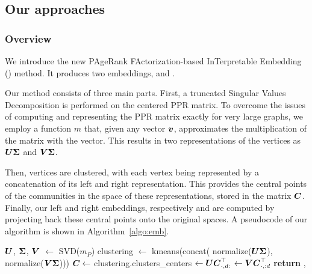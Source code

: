 
\subsection{Our approaches}\label{sec:approach}
\subsubsection{Overview} \label{subsec:overview}
We introduce the new PAgeRank FActorization-based InTerpretable Embedding (\parfaite) method. It produces two embeddings, \newembLeft and \newembRight.

Our method consists of three main parts. First, a truncated Singular Values Decomposition is performed on the centered PPR matrix. To overcome the issues of computing and representing the PPR matrix exactly for very large graphs, we employ a function $m$ that, given any vector $\boldsymbol{v}$, approximates the multiplication of the matrix with the vector. This results in two representations of the vertices as $\boldsymbol{U}\boldsymbol{\Sigma}$ and $\boldsymbol{V}\boldsymbol{\Sigma}$.

Then, vertices are clustered, with each vertex being represented by a concatenation of its left and right representation. This provides the central points of the communities in the space of these representations, stored in the matrix $\boldsymbol{C}$. Finally, our left and right embeddings, respectively \newembLeft and \newembRight are computed by projecting back these central points onto the original spaces. A pseudocode of our algorithm is shown in Algorithm~\ref{algo:emb}. 

\begin{algorithm}
    \caption{\parfaite}\label{algo:emb}
    \begin{algorithmic}[1]
    \State $\boldsymbol{U}$, $\boldsymbol{\Sigma}$, $\boldsymbol{V}$ $\gets$ SVD($m_P$)
    \State clustering $\gets$ kmeans(concat( normalize($\boldsymbol{U}\boldsymbol{\Sigma}$), normalize($\boldsymbol{V}\boldsymbol{\Sigma}$)))
    \State $\boldsymbol{C} \gets$ clustering.clusters\_centers
    \State \newembLeft $ \gets \boldsymbol{U}\boldsymbol{C}_{\cdot, d:}^\top$
    \State\newembRight $ \gets \boldsymbol{V}\boldsymbol{C}_{\cdot, :d}^\top$
    \State \textbf{return} \newembLeft, \newembRight
    \EndProcedure
    \end{algorithmic}
\end{algorithm}

